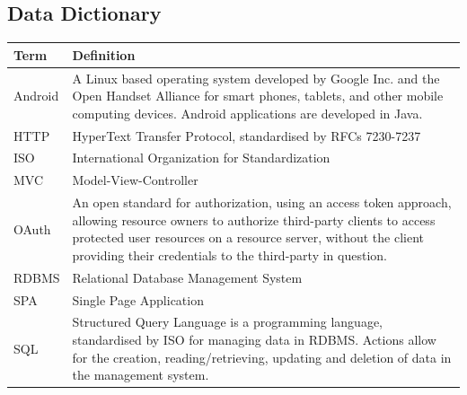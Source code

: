 \documentclass[a4paper,10pt]{article}
\begin{document}
\begin{appendices}
\newpage
\section{Data Dictionary}
\begin{tabu} to \textwidth { | X[l] | X[l] | }
	\hline
		\textbf{Term}		& \textbf{Definition}	\\ \hline \hline
		Android			&  A Linux based operating system developed by Google Inc. and the Open Handset Alliance for smart phones, tablets, and other mobile computing devices. Android applications are developed in Java. \\ \hline
		HTTP			& HyperText Transfer Protocol, standardised by RFCs 7230-7237 \\ \hline
		ISO				& International Organization for Standardization \\ \hline
		MVC				& Model-View-Controller \\ \hline
		OAuth			& An open standard for authorization, using an access token approach, allowing resource owners to authorize third-party clients to access protected user resources on a resource server, without the client providing their credentials to the third-party in question. \\ \hline
		RDBMS			& Relational Database Management System \\ \hline
		SPA				& Single Page Application \\ \hline
		SQL				& Structured Query Language is a programming language, standardised by ISO for managing data in RDBMS. Actions allow for the creation, reading/retrieving, updating and deletion of data in the management system. \\ \hline
	\hline
\end{tabu}

\end{appendices}

\newpage
\clearpage
{}
\printbibliography
\end{document}
